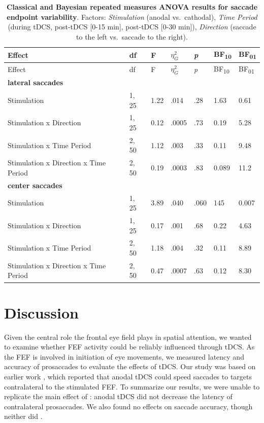 \documentclass[11pt,english,]{memoir}
\begin{document}
\begin{longtable}[]{@{}lllllll@{}}
\caption{\label{tab:tab-variability} \textbf{Classical and Bayesian repeated measures ANOVA results for saccade endpoint variability}. Factors: \emph{Stimulation} (anodal vs.~cathodal), \emph{Time Period} (during tDCS, post-tDCS {[}0-15 min{]}, post-tDCS {[}0-30 min{]}), \emph{Direction} (saccade to the left vs.~saccade to the right).}\tabularnewline
\toprule
Effect & df & F & \(\eta_{G}^{2}\) & \emph{p} & BF\textsubscript{10} & BF\textsubscript{01}\tabularnewline
\midrule
\endfirsthead
\toprule
Effect & df & F & \(\eta_{G}^{2}\) & \emph{p} & BF\textsubscript{10} & BF\textsubscript{01}\tabularnewline
\midrule
\endhead
\textbf{lateral saccades} & & & & & &\tabularnewline
Stimulation & 1, 25 & 1.22 & .014 & .28 & 1.63 & 0.61\tabularnewline
Stimulation x Direction & 1, 25 & 0.12 & .0005 & .73 & 0.19 & 5.28\tabularnewline
Stimulation x Time Period & 2, 50 & 1.12 & .003 & .33 & 0.11 & 9.48\tabularnewline
Stimulation x Direction x Time Period & 2, 50 & 0.19 & .0003 & .83 & 0.089 & 11.2\tabularnewline
\textbf{center saccades} & & & & & &\tabularnewline
Stimulation & 1, 25 & 3.89 & .040 & .060 & 145 & 0.007\tabularnewline
Stimulation x Direction & 1, 25 & 0.17 & .001 & .68 & 0.22 & 4.63\tabularnewline
Stimulation x Time Period & 2, 50 & 1.18 & .004 & .32 & 0.11 & 8.89\tabularnewline
Stimulation x Direction x Time Period & 2, 50 & 0.47 & .0007 & .63 & 0.12 & 8.30\tabularnewline
\bottomrule
\end{longtable}

\endgroup

\hypertarget{sacc_tDCS-discussion}{%
\section{Discussion}\label{sacc_tDCS-discussion}}

Given the central role the frontal eye field plays in spatial attention, we wanted to examine whether FEF activity could be reliably influenced through tDCS. As the FEF is involved in initiation of eye movements, we measured latency and accuracy of prosaccades to evaluate the effects of tDCS. Our study was based on earlier work \autocite{Kanai2012}, which reported that anodal tDCS could speed saccades to targets contralateral to the stimulated FEF. To summarize our results, we were unable to replicate the main effect of \textcite{Kanai2012}: anodal tDCS did not decrease the latency of contralateral prosaccades. We also found no effects on saccade accuracy, though neither did \textcite{Kanai2012}.
\end{document}
